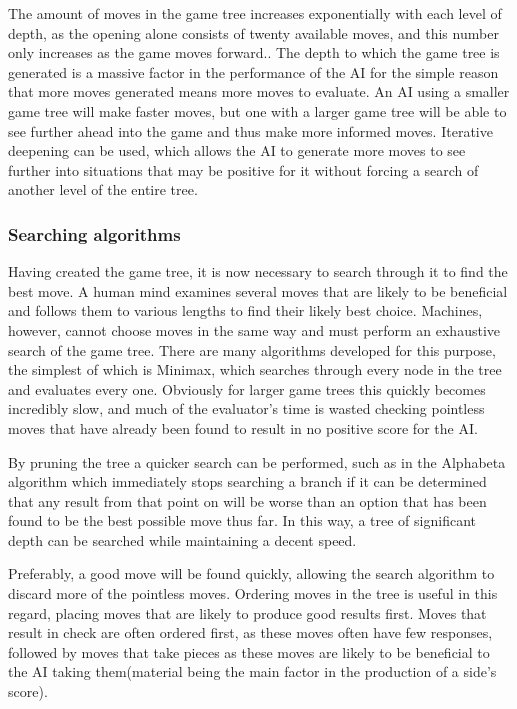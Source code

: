 \documentclass{l3proj}
\begin{document}
	The amount of moves in the game tree increases exponentially with each level of depth, as the opening alone consists of twenty available moves, and this number only increases as the game moves forward.. The depth to which the game tree is generated is a massive factor in the performance of the AI for the simple reason that more moves generated means more moves to evaluate. An AI using a smaller game tree will make faster moves, but one with a larger game tree will be able to see further ahead into the game and thus make more informed moves. Iterative deepening can be used, which allows the AI to generate more moves to see further into situations that may be positive for it without forcing a search of another level of the entire tree.

\subsubsection{Searching algorithms}

	Having created the game tree, it is now necessary to search through it to find the best move.  A human mind examines several moves that are likely to be beneficial and follows them to various lengths to find their likely best choice. Machines, however, cannot choose moves in the same way and must perform an exhaustive search of the game tree. There are many algorithms developed for this purpose, the simplest of which is Minimax, which searches through every node in the tree and evaluates every one. Obviously for larger game trees this quickly becomes incredibly slow, and much of the evaluator's time is wasted checking pointless moves that have already been found to result in no positive score for the AI.

	By pruning the tree a quicker search can be performed, such as in the Alphabeta algorithm which immediately stops searching a branch if it can be determined that any result from that point on will be worse than an option that has been found to be the best possible move thus far. In this way, a tree of significant depth can be searched while maintaining a decent speed.

	Preferably, a good move will be found quickly, allowing the search algorithm to discard more of the pointless moves. Ordering moves in the tree is useful in this regard, placing moves that are likely to produce good results first. Moves that result in check are often ordered first, as these moves often have few responses, followed by moves that take pieces as these moves are likely to be beneficial to the AI taking them(material being the main factor in the production of a side's score).
\end{document}
